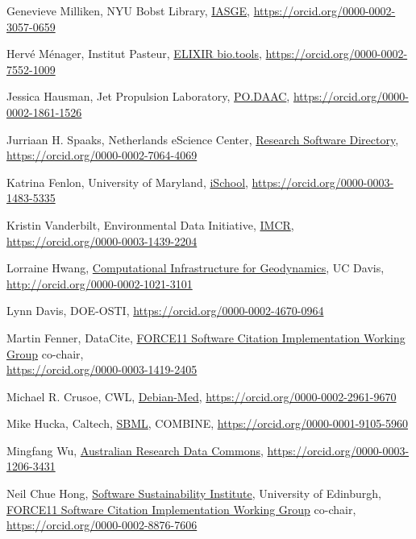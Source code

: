\documentclass[11pt]{article}
\begin{document}
\begin{spacing}{0.86}
Genevieve Milliken, NYU Bobst Library, \href{https://investigating-archiving-git.gitlab.io/}{IASGE},
\url{https://orcid.org/0000-0002-3057-0659}

Hervé Ménager, Institut Pasteur, \href{https://bio.tools/}{ELIXIR bio.tools},
\url{https://orcid.org/0000-0002-7552-1009}

Jessica Hausman, Jet Propulsion Laboratory, \href{https://podaac.jpl.nasa.gov/}{PO.DAAC},
\url{https://orcid.org/0000-0002-1861-1526}

Jurriaan H. Spaaks, Netherlands eScience Center, \href{https://www.research-software.nl/}{Research Software Directory},\\
\url{https://orcid.org/0000-0002-7064-4069}

Katrina Fenlon, University of Maryland, \href{https://ischool.umd.edu/}{iSchool},
\url{https://orcid.org/0000-0003-1483-5335}

Kristin Vanderbilt, Environmental Data Initiative, \href{https://imcr-hackathon.github.io/website/}{IMCR},
\url{https://orcid.org/0000-0003-1439-2204}

Lorraine Hwang, \href{https://geodynamics.org/}{Computational Infrastructure for Geodynamics}, UC Davis,\\
\url{http://orcid.org/0000-0002-1021-3101}

Lynn Davis, DOE-OSTI, \url{https://orcid.org/0000-0002-4670-0964}

Martin Fenner, DataCite, \href{https://www.force11.org/group/software-citation-implementation-working-group}{FORCE11 Software Citation Implementation Working Group} co-chair,\\
\url{https://orcid.org/0000-0003-1419-2405}

Michael R. Crusoe, CWL, \href{https://www.debian.org/devel/debian-med/}{Debian-Med},
\url{https://orcid.org/0000-0002-2961-9670}

Mike Hucka, Caltech, \href{http://sbml.org/Main_Page}{SBML}, COMBINE,
\url{https://orcid.org/0000-0001-9105-5960}

Mingfang Wu, \href{https://ardc.edu.au/}{Australian Research Data Commons},
\url{https://orcid.org/0000-0003-1206-3431}

Neil Chue Hong, \href{https://www.software.ac.uk/}{Software Sustainability Institute}, University of Edinburgh, \href{https://www.force11.org/group/software-citation-implementation-working-group}{FORCE11 Software Citation Implementation Working Group} co-chair, 
\url{https://orcid.org/0000-0002-8876-7606}


\end{spacing}
\end{document}
